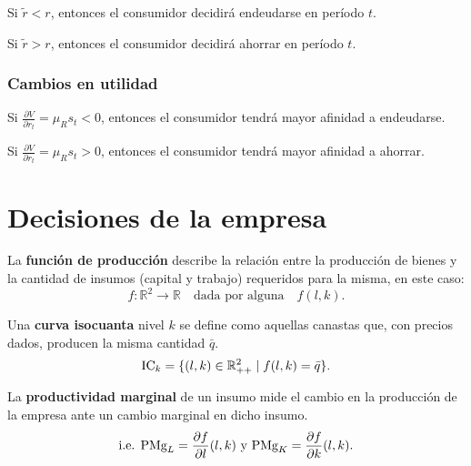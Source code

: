 \documentclass[8pt,a4paper]{extarticle}
\begin{document}
\begin{multicols}{3}
\begin{eqlist}
\item Si $ \tilde{r} < r $, entonces el consumidor decidirá endeudarse en período $t$.
\item Si $ \tilde{r} > r $, entonces el consumidor decidirá ahorrar en período $t$.
\end{eqlist}

\subsubsection*{Cambios en utilidad}

\begin{eqlist}
\item Si $\displaystyle \frac{\partial V}{\partial r_t} = \mu_R s_t < 0$, entonces el consumidor tendrá mayor afinidad a endeudarse.
\item Si $\displaystyle \frac{\partial V}{\partial r_t} = \mu_R s_t > 0$, entonces el consumidor tendrá mayor afinidad a ahorrar.
\end{eqlist}

\newpage

\section{Decisiones de la empresa}

\begin{boxdef}
	La \textbf{función de producción} describe la relación entre la producción de bienes y la cantidad de insumos (capital y trabajo) requeridos para la misma, en este caso:
	\[
		f: \mathbb{R}^2 \to \mathbb{R} \quad \text{dada por alguna} \quad f(l, k)
	.\] 
\end{boxdef}

\begin{boxdef}[Isocuanta]
Una \textbf{curva isocuanta} nivel $k$ se define como aquellas canastas que, con precios dados, producen la misma cantidad $\bar{q}$. \\
$$\text{\normalfont IC}_k = \{(l, k) \in \mathbb{R}^2_{++} \mid f(l, k) = \bar{q} \}.$$
\end{boxdef}

\begin{boxdef}
	La \textbf{productividad marginal} de un insumo mide el cambio en la producción de la empresa ante un cambio marginal en dicho insumo.
	\[
		\text{\normalfont i.e. PMg}_L = \frac{\partial f}{\partial l} (l, k)\ \text{y } \text{\normalfont PMg}_K = \frac{\partial f}{\partial k} (l, k)
	.\] 
\end{boxdef}


\end{multicols}
\end{document}
